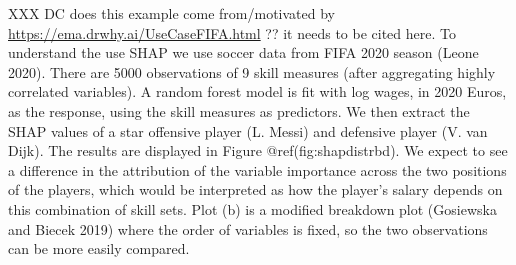 \documentclass[
]{article}
\begin{document}
XXX DC does this example come from/motivated by
\url{https://ema.drwhy.ai/UseCaseFIFA.html} ?? it needs to be cited
here. To understand the use SHAP we use soccer data from FIFA 2020
season (Leone 2020). There are 5000 observations of 9 skill measures
(after aggregating highly correlated variables). A random forest model
is fit with log wages, in 2020 Euros, as the response, using the skill
measures as predictors. We then extract the SHAP values of a star
offensive player (L. Messi) and defensive player (V. van Dijk). The
results are displayed in Figure @ref(fig:shapdistrbd). We expect to see
a difference in the attribution of the variable importance across the
two positions of the players, which would be interpreted as how the
player's salary depends on this combination of skill sets. Plot (b) is a
modified breakdown plot (Gosiewska and Biecek 2019) where the order of
variables is fixed, so the two observations can be more easily compared.
\end{document}
